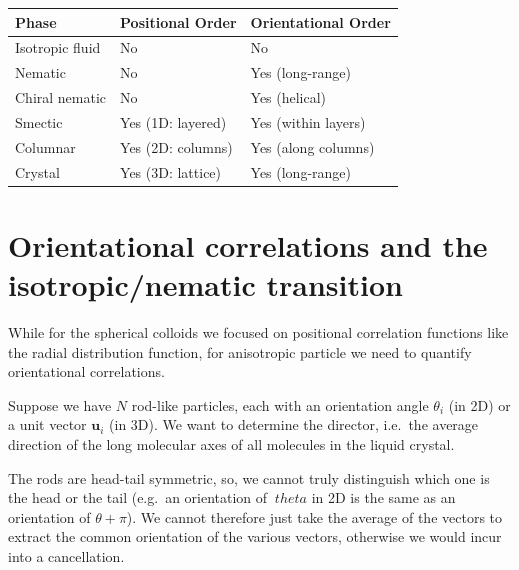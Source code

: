 \documentclass[
  letterpaper,
  enabledeprecatedfontcommands]{report}
\begin{document}
\begin{longtable}[]{@{}
  >{\raggedright\arraybackslash}p{}
  >{\raggedright\arraybackslash}p{}
  >{\raggedright\arraybackslash}p{}@{}}
\toprule\noalign{}
\begin{minipage}[b]{\linewidth}\raggedright
\textbf{Phase}
\end{minipage} & \begin{minipage}[b]{\linewidth}\raggedright
\textbf{Positional Order}
\end{minipage} & \begin{minipage}[b]{\linewidth}\raggedright
\textbf{Orientational Order}
\end{minipage} \\
\midrule\noalign{}
\endhead
\bottomrule\noalign{}
\endlastfoot
Isotropic fluid & No & No \\
Nematic & No & Yes (long-range) \\
Chiral nematic & No & Yes (helical) \\
Smectic & Yes (1D: layered) & Yes (within layers) \\
Columnar & Yes (2D: columns) & Yes (along columns) \\
Crystal & Yes (3D: lattice) & Yes (long-range) \\
\end{longtable}

\section{Orientational correlations and the isotropic/nematic
transition}\label{orientational-correlations-and-the-isotropicnematic-transition}

While for the spherical colloids we focused on positional correlation
functions like the radial distribution function, for anisotropic
particle we need to quantify orientational correlations.

Suppose we have \(N\) rod-like particles, each with an orientation angle
\(\theta_i\) (in 2D) or a unit vector \(\mathbf{u}_i\) (in 3D). We want
to determine the director, i.e.~the average direction of the long
molecular axes of all molecules in the liquid crystal.

The rods are head-tail symmetric, so, we cannot truly distinguish which
one is the head or the tail (e.g.~an orientation of \(\  theta\) in 2D
is the same as an orientation of \(\theta+\pi\)). We cannot therefore
just take the average of the vectors to extract the common orientation
of the various vectors, otherwise we would incur into a cancellation.
\end{document}
